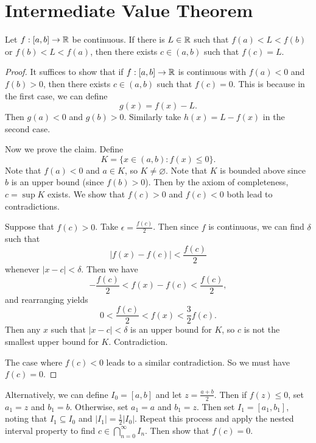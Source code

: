 \section{Intermediate Value Theorem}
\begin{theorem}
  Let $f : [a, b] \to \mathbb{R}$ be continuous. If there is
  $L \in \mathbb{R}$
  such that $f(a) < L < f(b)$ or $f(b) < L < f(a)$,
  then there exists $c \in (a, b)$ such that $f(c) = L$.
\end{theorem}

\begin{proof}[Proof]
  It suffices to show that if $f : [a, b] \to \mathbb{R}$ is
  continuous with $f(a) < 0$ and $f(b) > 0$, then
  there exists $c \in (a, b)$ such that $f(c) = 0$.
  This is because in the first case, we can define
  \[g(x) = f(x) - L.\]
  Then $g(a) < 0$ and $g(b) > 0$. Similarly take
  $h(x) = L - f(x)$ in the second case.

  Now we prove the claim. Define
  \[K = \{x \in (a, b) : f(x) \le 0\}.\]
  Note that $f(a) < 0$ and $a \in K$, so
  $K \ne \varnothing$. Note that $K$ is bounded above
  since $b$ is an upper bound (since $f(b) > 0$).
  Then by the axiom of completeness,
  $c = \sup K$ exists. We show that $f(c) > 0$ and
  $f(c) < 0$ both lead to contradictions.

  Suppose that $f(c) > 0$. Take
  $\epsilon = \frac{f(c)}{2}$. Then since $f$ is
  continuous, we can find
  $\delta$ such that
  \[|f(x) - f(c)| < \frac{f(c)}{2}\]
  whenever $|x - c| < \delta$. Then we have
  \[-\frac{f(c)}{2} < f(x) - f(c) < \frac{f(c)}{2},\]
  and rearranging yields
  \[0 < \frac{f(c)}{2} < f(x) < \frac{3}{2}f(c).\]
  Then any $x$ such that $|x - c| < \delta$ is an
  upper bound for $K$, so $c$ is not the smallest upper
  bound for $K$. Contradiction.

  The case where $f(c) < 0$ leads to a similar
  contradiction. So we must have $f(c) = 0$.
\end{proof}

\begin{remark}
  Alternatively, we can define $I_0 = [a, b]$ and let
  $z = \frac{a + b}{2}$. Then if $f(z) \le 0$,
  set $a_1 = z$ and $b_1 = b$. Otherwise, set $a_1 = a$
  and $b_1 = z$. Then set $I_1 = [a_1, b_1]$, noting
  that $I_1 \subseteq I_0$ and $|I_1| = \frac{1}{2}|I_0|$.
  Repeat this process and apply the nested interval
  property to find $c \in \bigcap_{n = 0}^\infty I_n$.
  Then show that $f(c) = 0$.
\end{remark}
